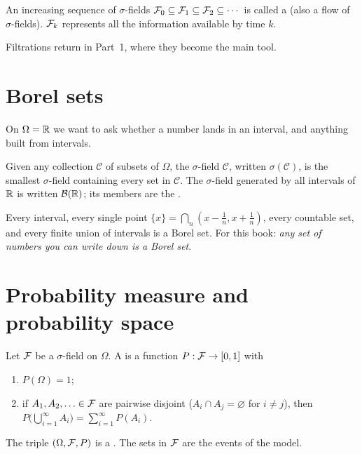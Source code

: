\begin{definition}[Filtration]
An increasing sequence of $\sigma$-fields $\mathcal F_0\subseteq\mathcal F_1\subseteq\mathcal F_2\subseteq\cdots$ is called a  (also a flow of $\sigma$-fields). $\mathcal F_k$ represents all the information available by time $k$.
\end{definition}

Filtrations return in Part~1, where they become the main tool.

\section{Borel sets}

On $\Omega=\mathbb{R}$ we want to ask whether a number lands in an interval, and anything built from intervals.

\begin{definition}
Given any collection $\mathcal C$ of subsets of $\Omega$, the $\sigma$-field  $\mathcal C$, written $\sigma(\mathcal C)$, is the smallest $\sigma$-field containing every set in $\mathcal C$. The $\sigma$-field generated by all intervals of $\mathbb{R}$ is written $\mathcal B(\mathbb{R})$; its members are the .
\end{definition}

Every interval, every single point $\{x\}=\bigcap_n(x-\frac1n,x+\frac1n)$, every countable set, and every finite union of intervals is a Borel set. For this book: \emph{any set of numbers you can write down is a Borel set}.

\section{Probability measure and probability space}

\begin{definition}
\label{def:prob}
Let $\mathcal F$ be a $\sigma$-field on $\Omega$. A  is a function $P:\mathcal F\to[0,1]$ with
\begin{enumerate}[label=(\roman*)]
  \item $P(\Omega)=1$;
  \item if $A_1,A_2,\ldots\in\mathcal F$ are pairwise disjoint ($A_i\cap A_j=\varnothing$ for $i\ne j$), then $P\big(\bigcup_{i=1}^\infty A_i\big)=\sum_{i=1}^\infty P(A_i)$.
\end{enumerate}
The triple $(\Omega,\mathcal F,P)$ is a . The sets in $\mathcal F$ are the events of the model.
\end{definition}


